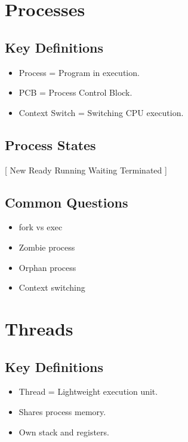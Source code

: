 \section{Processes}

\subsection*{Key Definitions}

\begin{itemize}
\item Process = Program in execution.
\item PCB = Process Control Block.
\item Context Switch = Switching CPU execution.
\end{itemize}

\subsection*{Process States}

[
New \rightarrow Ready \rightarrow Running \rightarrow Waiting \rightarrow Terminated
]

\subsection*{Common Questions}

\begin{itemize}
\item fork vs exec
\item Zombie process
\item Orphan process
\item Context switching
\end{itemize}

\section{Threads}

\subsection*{Key Definitions}

\begin{itemize}
\item Thread = Lightweight execution unit.
\item Shares process memory.
\item Own stack and registers.
\end{itemize}

